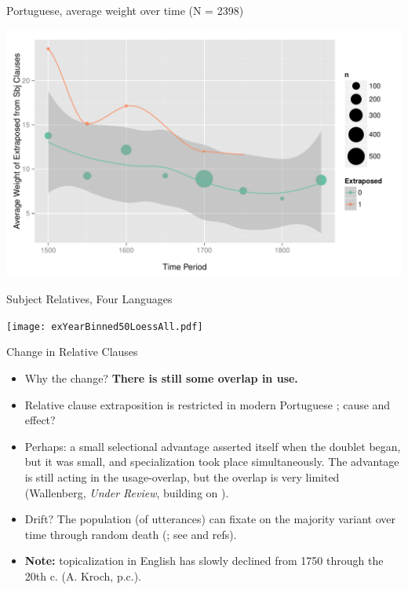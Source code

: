 \documentclass[hyperref={pdfpagelabels=false}]{beamer}
\begin{document}
\begin{frame}{Portuguese, average weight over time (N = 2398)}

\begin{center}
\includegraphics[width=1.1\textwidth]{exWeightYearBinned50Loessport.pdf}
\end{center}
\end{frame}

\begin{frame}{Subject Relatives, Four Languages}

\begin{center}
\texttt{[image: exYearBinned50LoessAll.pdf]}
\end{center}
\end{frame}



\begin{frame}{Change in Relative Clauses}
\begin{itemize}
	\item Why the change? \textbf{There is still some overlap in use.}
	\item Relative clause extraposition is restricted in modern Portuguese \citep{cardoso2011, cardoso2012}; cause and effect?
	\item Perhaps: a small selectional advantage asserted itself when the doublet began, but it was small, and specialization took place simultaneously. The advantage is still acting in the usage-overlap, but the overlap is very limited (Wallenberg, \textsl{Under Review}, building on \citealt{kiparsky1995}).
	\item Drift? The population (of utterances) can fixate on the majority variant over time through random death (\citealt{moran1958}; see \citealt{nowak2006} and refs).
	\item \textbf{Note:} topicalization in English has slowly declined from 1750 through the 20th c. (A. Kroch, p.c.).
\end{itemize}
\end{frame}
\end{document}
